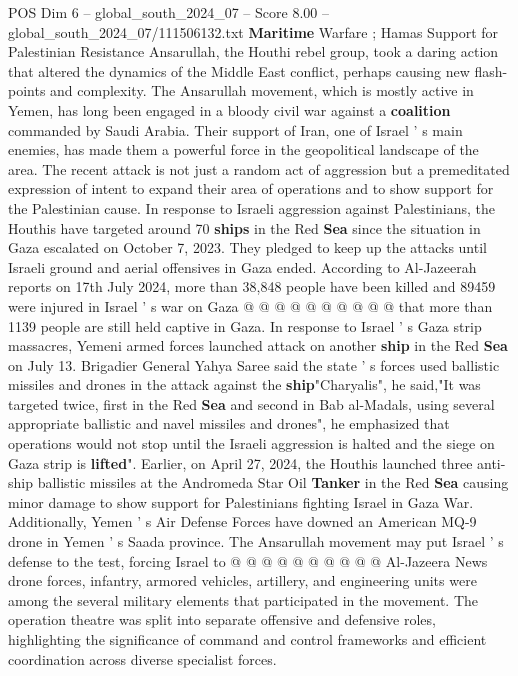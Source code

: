 \begin{textsample}{POS Dim 6 – global\_south\_2024\_07 – Score 8.00 – global\_south\_2024\_07/111506132.txt}  \label{ex:f6_pos_332}
\textbf{Maritime} Warfare ; Hamas Support for Palestinian Resistance Ansarullah, the Houthi rebel group, took a daring action that altered the dynamics of the Middle East conflict, perhaps causing new flash-points and complexity.
The Ansarullah movement, which is mostly active in Yemen, has long been engaged in a bloody civil war against a \textbf{coalition} commanded by Saudi Arabia.
Their support of Iran, one of Israel ' s main enemies, has made them a powerful force in the geopolitical landscape of the area.
The recent attack is not just a random act of aggression but a premeditated expression of intent to expand their area of operations and to show support for the Palestinian cause.
In response to Israeli aggression against Palestinians, the Houthis have targeted around 70 \textbf{ships} in the Red \textbf{Sea} since the situation in Gaza escalated on October 7, 2023.
They pledged to keep up the attacks until Israeli ground and aerial offensives in Gaza ended.
According to Al-Jazeerah reports on 17th July 2024, more than 38,848 people have been killed and 89459 were injured in Israel ' s war on Gaza @ @ @ @ @ @ @ @ @ @ that more than 1139 people are still held captive in Gaza.
In response to Israel ' s Gaza strip massacres, Yemeni armed forces launched attack on another \textbf{ship} in the Red \textbf{Sea} on July 13.
Brigadier General Yahya Saree said the state ' s forces used ballistic missiles and drones in the attack against the \textbf{ship}"Charyalis", he said,"It was targeted twice, first in the Red \textbf{Sea} and second in Bab al-Madals, using several appropriate ballistic and navel missiles and drones", he emphasized that operations would not stop until the Israeli aggression is halted and the siege on Gaza strip is \textbf{lifted}".
Earlier, on April 27, 2024, the Houthis launched three anti-ship ballistic missiles at the Andromeda Star Oil \textbf{Tanker} in the Red \textbf{Sea} causing minor damage to show support for Palestinians fighting Israel in Gaza War.
Additionally, Yemen ' s Air Defense Forces have downed an American MQ-9 drone in Yemen ' s Saada province.
The Ansarullah movement may put Israel ' s defense to the test, forcing Israel to @ @ @ @ @ @ @ @ @ @ Al-Jazeera News drone forces, infantry, armored vehicles, artillery, and engineering units were among the several military elements that participated in the movement.
The operation theatre was split into separate offensive and defensive roles, highlighting the significance of command and control frameworks and efficient coordination across diverse specialist forces.

\end{textsample}
